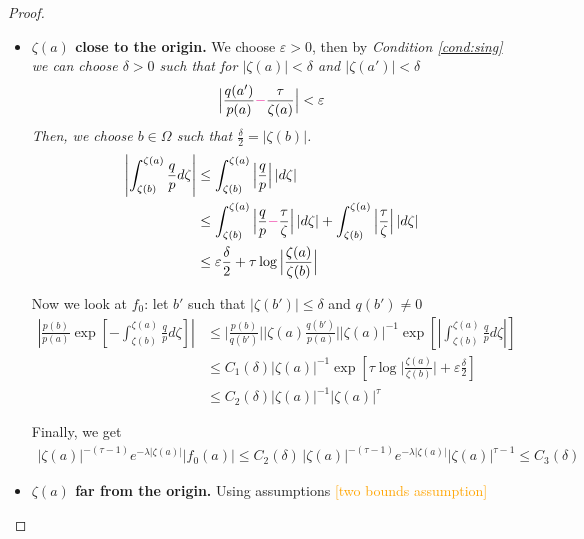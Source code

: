 \documentclass{article}
\theoremstyle{plain}
\begin{document}
\color{RoyalBlue}

\begin{proof}
    \begin{itemize}
    \item \textbf{$\zeta(a)$ close to the origin.} We choose $\varepsilon>0$, then by \em Condition \eqref{cond:sing} we can choose $\delta>0$ such that for $|\zeta(a)|<\delta$ and $|\zeta(a')|<\delta$
 \begin{equation}
      \Big\vert\frac{q(a')}{p(a)}\textcolor{magenta}{-}\frac{\tau}{\zeta(a)}\Big\vert<\varepsilon
  \end{equation}
 Then, we choose $b\in\Omega$ such that $\tfrac{\delta}{2}=|\zeta(b)|$.
  \begin{align*}
      \left\vert\int_{\zeta(b)}^{\zeta(a)} \frac{q}{p}d\zeta\right\vert&\leq \int_{\zeta(b)}^{\zeta(a)} \Big\vert \frac{q}{p}\Big\vert \, |d\zeta| \\
      &\leq \int_{\zeta(b)}^{\zeta(a)} \Big\vert \frac{q}{p} \textcolor{magenta}{-} \frac{\tau}{\zeta}\Big\vert \, |d\zeta| +\int_{\zeta(b)}^{\zeta(a)} \Big\vert\frac{\tau}{\zeta}\Big\vert \, |d\zeta| \\
      &\leq \varepsilon \frac{\delta}{2} + \tau \log \Big\vert\frac{\zeta(a)}{\zeta(b)}\Big\vert
        \end{align*}

 Now we look at $f_0$: let $b'$ such that $|\zeta(b')|\leq \delta$ and $q(b')\neq 0$
  \begin{align*}
      \left\vert\frac{p(b)}{p(a)}\exp\left[-\int_{\zeta(b)}^{\zeta(a)}\frac{q}{p} d\zeta\right]\right\vert &\leq \Big\vert\frac{p(b)}{q(b')}\Big\vert \Big\vert\zeta(a)\frac{q(b')}{p(a)}\Big\vert \Big\vert \zeta(a)\Big\vert^{-1} \exp\left[\left\vert\int_{\zeta(b)}^{\zeta(a)}\frac{q}{p} d\zeta \right\vert\right]\\
      &\leq C_1(\delta) \Big\vert \zeta(a)\Big\vert^{-1} \exp\left[ \tau \log\Big\vert\frac{\zeta(a)}{\zeta(b)}\Big\vert+ \varepsilon \frac{\delta}{2}\right]\\
      &\leq C_2(\delta) \Big\vert \zeta(a)\Big\vert^{-1} \Big\vert\zeta(a)\Big\vert^{\tau}   
      \end{align*}
 
Finally, we get  
  \begin{align*}
      |\zeta(a)|^{-(\tau-1)} e^{-\lambda |\zeta(a)|} |f_0(a)|\leq  C_2(\delta)\, |\zeta(a)|^{-(\tau-1)} e^{-\lambda |\zeta(a)|} |\zeta(a)|^{\tau-1} \leq C_3(\delta)
  \end{align*}
      \item \textbf{$\zeta(a)$ far from the origin.} Using assumptions \textcolor{orange}{[two bounds assumption]}


\end{itemize}
\end{proof}
\end{document}
